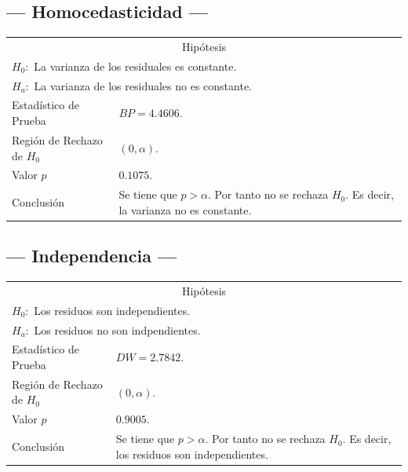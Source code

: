 \documentclass{article}
\begin{document}
\subsection{--- Homocedasticidad ---} %
\begin{center}
  \begin{tabular}{|l|p{8cm}|}
    \cline{1-2}
    \multicolumn{2}{|c|}{Hipótesis}\\ \cline{1-2}
    \multicolumn{2}{|l|}{\(H_0:\) La varianza de los residuales es constante.} \\ 
    \multicolumn{2}{|l|}{\(H_a:\) La varianza de los residuales no es constante.} \\ \cline{1-2}
    Estadístico de Prueba & \(BP = 4.4606\).\\ \cline{1-2} 
		Región de Rechazo de \(H_0\) & \((0, \alpha )\).\\ \cline{1-2} 
    Valor \(p\) & \(0.1075\).\\ \cline{1-2} 
    Conclusión & Se tiene que \(p> \alpha\). \newline 
		Por tanto no se rechaza \(H_0\). \newline 
		Es decir, la varianza no es constante. \\ \cline{1-2} 
  \end{tabular}
\end{center}

\subsection{--- Independencia ---} %
\begin{center}
  \begin{tabular}{|l|p{8cm}|}
    \cline{1-2}
    \multicolumn{2}{|c|}{Hipótesis}\\ \cline{1-2}
    \multicolumn{2}{|l|}{\(H_0:\) Los residuos son independientes.} \\ 
    \multicolumn{2}{|l|}{\(H_a:\) Los residuos no son indpendientes.} \\ \cline{1-2}
    Estadístico de Prueba & \(DW = 2.7842\).\\ \cline{1-2} 
		Región de Rechazo de \(H_0\) & \((0, \alpha )\).\\ \cline{1-2} 
    Valor \(p\) & \(0.9005\).\\ \cline{1-2} 
    Conclusión & Se tiene que \(p> \alpha\). \newline 
		Por tanto no se rechaza \(H_0\). \newline 
		Es decir, los residuos son independientes.\\ \cline{1-2} 
  \end{tabular}
\end{center}
\end{document}

